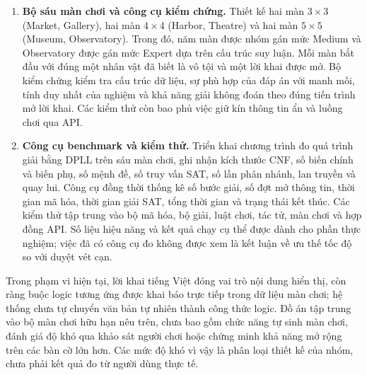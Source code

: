 \begin{enumerate}
    \item \textbf{Bộ sáu màn chơi và công cụ kiểm chứng.}
    Thiết kế hai màn $3 \times 3$ (Market, Gallery), hai màn $4 \times 4$ (Harbor, Theatre) và hai màn $5 \times 5$ (Museum, Observatory). Trong đó, năm màn được nhóm gán mức Medium và Observatory được gán mức Expert dựa trên cấu trúc suy luận. Mỗi màn bắt đầu với đúng một nhân vật đã biết là vô tội và một lời khai được mở. Bộ kiểm chứng kiểm tra cấu trúc dữ liệu, sự phù hợp của đáp án với manh mối, tính duy nhất của nghiệm và khả năng giải không đoán theo đúng tiến trình mở lời khai. Các kiểm thử còn bao phủ việc giữ kín thông tin ẩn và luồng chơi qua API.

    \item \textbf{Công cụ benchmark và kiểm thử.}
    Triển khai chương trình đo quá trình giải bằng DPLL trên sáu màn chơi, ghi nhận kích thước CNF, số biến chính và biến phụ, số mệnh đề, số truy vấn SAT, số lần phân nhánh, lan truyền và quay lui. Công cụ đồng thời thống kê số bước giải, số đợt mở thông tin, thời gian mã hóa, thời gian giải SAT, tổng thời gian và trạng thái kết thúc. Các kiểm thử tập trung vào bộ mã hóa, bộ giải, luật chơi, tác tử, màn chơi và hợp đồng API. Số liệu hiệu năng và kết quả chạy cụ thể được dành cho phần thực nghiệm; việc đã có công cụ đo không được xem là kết luận về ưu thế tốc độ so với duyệt vét cạn.
\end{enumerate}

Trong phạm vi hiện tại, lời khai tiếng Việt đóng vai trò nội dung hiển thị, còn ràng buộc logic tương ứng được khai báo trực tiếp trong dữ liệu màn chơi; hệ thống chưa tự chuyển văn bản tự nhiên thành công thức logic. Đồ án tập trung vào bộ màn chơi hữu hạn nêu trên, chưa bao gồm chức năng tự sinh màn chơi, đánh giá độ khó qua khảo sát người chơi hoặc chứng minh khả năng mở rộng trên các bàn cờ lớn hơn. Các mức độ khó vì vậy là phân loại thiết kế của nhóm, chưa phải kết quả đo từ người dùng thực tế.
